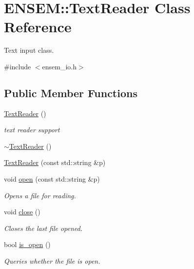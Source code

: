 \hypertarget{classENSEM_1_1TextReader}{}\section{E\+N\+S\+EM\+:\+:Text\+Reader Class Reference}
\label{classENSEM_1_1TextReader}


Text input class.  




{\ttfamily \#include $<$ensem\+\_\+io.\+h$>$}

\subsection*{Public Member Functions}
\begin{DoxyCompactItemize}
\item 
\mbox{\hyperlink{classENSEM_1_1TextReader_a139e8717032f310089148dd58b30d1d2}{Text\+Reader}} ()
\begin{DoxyCompactList}\small\item\em text reader support \end{DoxyCompactList}\item 
\mbox{\hyperlink{classENSEM_1_1TextReader_a95ed1b116302f6fc2532451bd5df2dbd}{$\sim$\+Text\+Reader}} ()
\item 
\mbox{\hyperlink{classENSEM_1_1TextReader_a1c253bcaf58b6f01f25bb10b798f771e}{Text\+Reader}} (const std\+::string \&p)
\item 
void \mbox{\hyperlink{classENSEM_1_1TextReader_a167e412dc7a3a56fae35ccb4cc9d9029}{open}} (const std\+::string \&p)
\begin{DoxyCompactList}\small\item\em Opens a file for reading. \end{DoxyCompactList}\item 
void \mbox{\hyperlink{classENSEM_1_1TextReader_a19f171518a1c7a06739d2d7de016f346}{close}} ()
\begin{DoxyCompactList}\small\item\em Closes the last file opened. \end{DoxyCompactList}\item 
bool \mbox{\hyperlink{classENSEM_1_1TextReader_a67e8ac68ff413c1101522eedafc2d994}{is\+\_\+open}} ()
\begin{DoxyCompactList}\small\item\em Queries whether the file is open. \end{DoxyCompactList}\item 

\end{DoxyCompactItemize}
